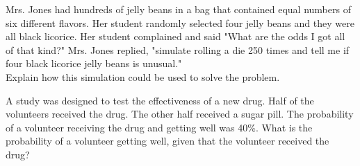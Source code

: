 
\item %
Mrs. Jones had hundreds of jelly beans in a bag that contained equal numbers of six different flavors. Her student randomly selected four jelly beans and they were all black licorice.
Her student complained and said "What are the odds I got all of that kind?" Mrs. Jones replied, "simulate rolling a die 250 times and tell me if four black licorice jelly beans is unusual."\\[10pt]
Explain how this simulation could be used to solve the problem.\\

\item %
A study was designed to test the effectiveness of a new drug. Half of the volunteers received the drug. The other half received a sugar pill. The probability of a volunteer receiving the drug and getting well was 40\%. What is the probability of a volunteer getting well, given that the volunteer received the drug?

